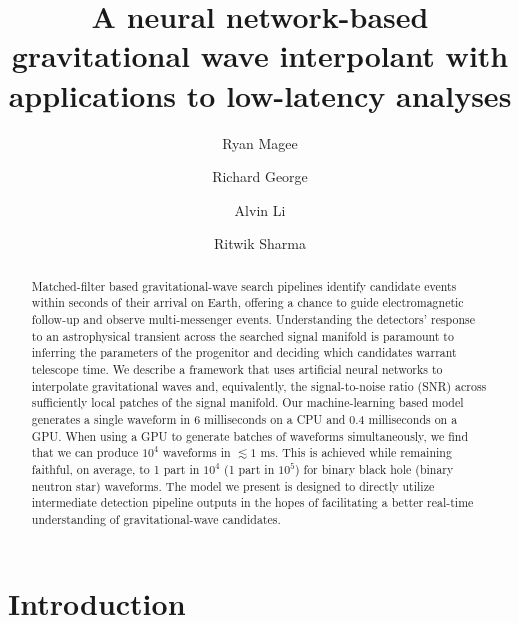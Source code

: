 \documentclass[twocolumn,prd,superscriptaddress,nofootinbib]{revtex4-1}
\begin{document}
\title{A neural network-based gravitational wave interpolant with applications to low-latency analyses}
\author{Ryan Magee }

\author{Richard George }

\author{Alvin Li }

\author{Ritwik Sharma }
\begin{abstract}


Matched-filter based gravitational-wave search pipelines identify candidate
events within seconds of their arrival on Earth, offering a chance to guide
electromagnetic follow-up and observe multi-messenger events.  Understanding
the detectors' response to an astrophysical transient across the searched signal
manifold is paramount to inferring the parameters of the progenitor and
deciding which candidates warrant telescope time. 
We describe a framework that uses artificial
neural networks to interpolate gravitational waves and, equivalently, the signal-to-noise ratio
(SNR) across sufficiently local patches of the signal manifold. Our
machine-learning based model generates a single waveform in 6 milliseconds on a
CPU and 0.4 milliseconds on a GPU. When using a GPU
to generate batches of waveforms simultaneously, we find that we can produce
$10^4$ waveforms in $\lesssim 1$ ms. This is achieved while remaining faithful, on
average, to 1 part in $10^4$ (1 part in $10^5$) for binary black hole (binary
neutron star) waveforms. The model we present is designed to directly utilize
intermediate detection pipeline outputs in the hopes of facilitating a
better real-time understanding of gravitational-wave candidates. 

\end{abstract}

\maketitle

\section{Introduction}\label{sec:intro}
\end{document}

